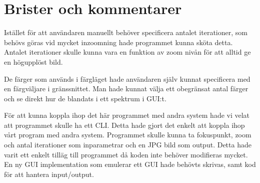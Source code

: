 \documentclass[a4paper]{article}
\begin{document}
\section{Brister och kommentarer}
Istället för att användaren manuellt behöver specificera antalet iterationer, som behövs göras vid mycket inzoomning hade programmet kunna sköta detta. Antalet iterationer skulle kunna vara en funktion av zoom nivån för att alltid ge en högupplöst bild.

De färger som används i färgläget hade användaren själv kunnat specificera med en färgväljare i gränssnittet. Man hade kunnat välja ett obegränsat antal färger och se direkt hur de blandats i ett spektrum i GUI:t.

För att kunna koppla ihop det här programmet med andra system hade vi velat att programmet skulle ha ett CLI. Detta hade gjort det enkelt att koppla ihop vårt program med andra system. Programmet skulle kunna ta fokuspunkt, zoom och antal iterationer som inparametrar och en JPG bild som output. Detta hade varit ett enkelt tilläg till programmet då koden inte behöver modifieras mycket. En ny GUI implementation som emulerar ett GUI hade behövts skrivas, samt kod för att hantera input/output.
\newline
\newline
\end{document}
